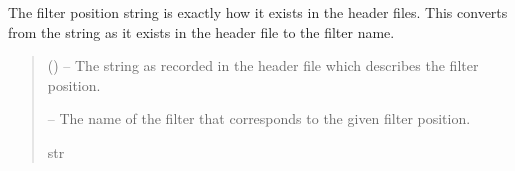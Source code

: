 \documentclass[letterpaper,11pt,english]{sphinxmanual}
\begin{document}

\begin{savenotes}\begin{fulllineitems}
\label{\detokenize{code/opihiexarata.library.conversion:opihiexarata.library.conversion.filter_position_string_to_filter_name}}
\pysigstartsignatures
{}
\pysigstopsignatures
\sphinxAtStartPar
The filter position string is exactly how it exists in the header files.
This converts from the string as it exists in the header file to the filter
name.
\begin{quote}\begin{description}
\sphinxAtStartPar
{} () – The string as recorded in the header file which describes the filter
position.

\sphinxAtStartPar
{} – The name of the filter that corresponds to the given filter position.

\sphinxAtStartPar
str

\end{description}\end{quote}

\end{fulllineitems}\end{savenotes}

\end{document}
